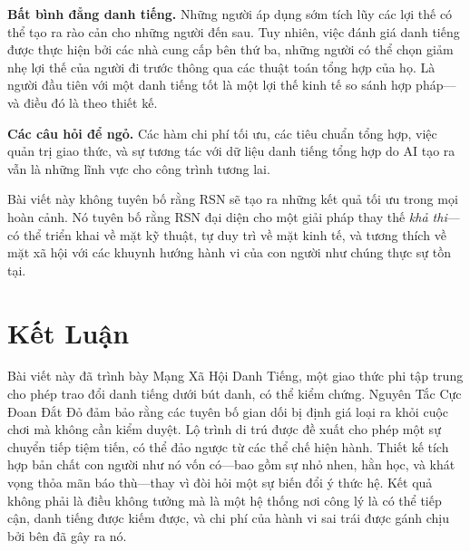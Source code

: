 \documentclass[11pt,a4paper,twocolumn]{article}
\begin{document}
\textbf{Bất bình đẳng danh tiếng.} Những người áp dụng sớm tích lũy các lợi thế có thể tạo ra rào cản cho những người đến sau. Tuy nhiên, việc đánh giá danh tiếng được thực hiện bởi các nhà cung cấp bên thứ ba, những người có thể chọn giảm nhẹ lợi thế của người đi trước thông qua các thuật toán tổng hợp của họ. Là người đầu tiên với một danh tiếng tốt là một lợi thế kinh tế so sánh hợp pháp---và điều đó là theo thiết kế.

\textbf{Các câu hỏi để ngỏ.} Các hàm chi phí tối ưu, các tiêu chuẩn tổng hợp, việc quản trị giao thức, và sự tương tác với dữ liệu danh tiếng tổng hợp do AI tạo ra vẫn là những lĩnh vực cho công trình tương lai.

Bài viết này không tuyên bố rằng RSN sẽ tạo ra những kết quả tối ưu trong mọi hoàn cảnh. Nó tuyên bố rằng RSN đại diện cho một giải pháp thay thế \emph{khả thi}---có thể triển khai về mặt kỹ thuật, tự duy trì về mặt kinh tế, và tương thích về mặt xã hội với các khuynh hướng hành vi của con người như chúng thực sự tồn tại.

\section{Kết Luận}

Bài viết này đã trình bày Mạng Xã Hội Danh Tiếng, một giao thức phi tập trung cho phép trao đổi danh tiếng dưới bút danh, có thể kiểm chứng. Nguyên Tắc Cực Đoan Đắt Đỏ đảm bảo rằng các tuyên bố gian dối bị định giá loại ra khỏi cuộc chơi mà không cần kiểm duyệt. Lộ trình di trú được đề xuất cho phép một sự chuyển tiếp tiệm tiến, có thể đảo ngược từ các thể chế hiện hành. Thiết kế tích hợp bản chất con người như nó vốn có---bao gồm sự nhỏ nhen, hằn học, và khát vọng thỏa mãn báo thù---thay vì đòi hỏi một sự biến đổi ý thức hệ. Kết quả không phải là điều không tưởng mà là một hệ thống nơi công lý là có thể tiếp cận, danh tiếng được kiếm được, và chi phí của hành vi sai trái được gánh chịu bởi bên đã gây ra nó.


\end{document}
